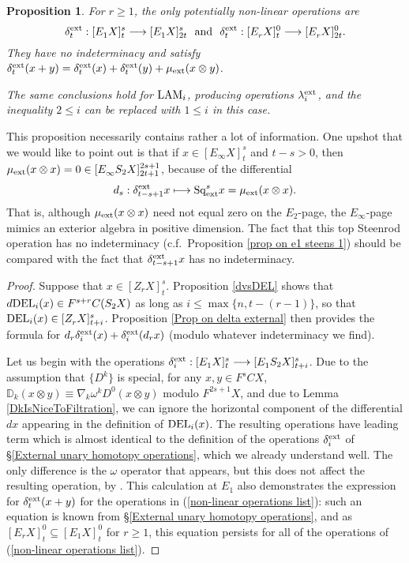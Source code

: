 \documentclass[11pt]{amsart} \renewcommand{\baselinestretch}{1.2}
\theoremstyle{plain}
\newtheorem{prop}[thm]{Proposition}
\numberwithin{equation}{section} %
\theoremstyle{plain}
\newtheorem{prop}[thm]{Proposition}
\numberwithin{equation}{chapter} %
\renewcommand{\to}{\longrightarrow}
\newcommand{\twist}{\omega}
\newcommand{\Sq}{\mathrm{Sq}}
\newcommand{\E}[5]{[E^{#1}_{#2}#3]^{#4}_{#5}}
\newcommand{\Edownup}[5]{[E_{#1}^{#2}#3]^{#4}_{#5}}
\newcommand{\EZdownup}[5]{[Z^{#2}_{#1}#3]^{#4}_{#5}}
\renewcommand{\mapsto}{\longmapsto}
\begin{document}
\begin{second quadrant homotopy sseq operations}
\begin{prop}
For $r\geq1$, the only potentially non-linear operations are
\begin{equation}
\label{non-linear  operations list}
\delta^\textup{ext}_t: \E{}{1}{X}{s}{t}\to  \E{}{1}{X}{s}{2t}\textup{ \ and \ } \delta^\textup{ext}_t: \E{}{r}{X}{0}{t}\to  \E{}{r}{X}{0}{2t}.
\end{equation}
They  have no indeterminacy and satisfy $\delta^\textup{ext}_t(x+y)=\delta^\textup{ext}_t(x)+\delta^\textup{ext}_t(y)+\mu_\textup{ext}(x\otimes y)$.


The same conclusions hold for $\textup{LAM}_i$, producing operations $\lambda_i^\textup{ext}$, and the inequality $2\leq i$ can be replaced with $1\leq i$ in this case.
\end{prop}
\noindent This proposition necessarily contains rather a lot of information. One upshot that we would like to point out is that if $x\in \E{}{\infty}{X}{s}{t}$ and $t-s>0$, then $\mu_\textup{ext}(x\otimes x)=0\in\E{}{\infty}{S_2X}{2s+1}{2t+1}$, because of the differential
\[d_{s}:\delta^\textup{ext}_{t-s+1}x\mapsto \Sq_\textup{ext}^{s}x=\mu_\textup{ext}(x\otimes x).\]
That is, although $\mu_\textup{ext}(x\otimes x)$ need not equal zero on the $E_2$-page, the $E_\infty$-page mimics an exterior algebra in positive dimension.
The fact  that this top Steenrod operation has no indeterminacy (c.f.\ Proposition \ref{prop on e1 steens 1}) should be compared  with the fact that $\delta^\textup{ext}_{t-s+1}x$ has no indeterminacy.

\begin{proof}
Suppose that $x\in \EZdownup{r}{}{X}{s}{t}$. Proposition \ref{dvsDEL} shows that $d\textup{DEL}_i(x)\in F^{s+r}C(S_2X)$ as long as $i\leq \max\{n,t-(r-1)\}$, so that $\textup{DEL}_i(x)\in \EZdownup{r}{}{X}{s}{t+i}$. 
Proposition \ref{Prop on delta external} then provides the formula for 
$d_r\delta^\textup{ext}_i(x)+ \delta^\textup{ext}_i(d_rx)$ (modulo whatever indeterminacy we find).

Let us begin with the operations $\delta^\textup{ext}_i:\Edownup{1}{}{X}{s}{t}\to \Edownup{1}{}{S_2X}{s}{t+i}$. Due to the assumption that $\{D^k\}$ is special, for any $x,y\in F^{s}CX$, $\mathbb{D}_k(x\otimes  y)\equiv \nabla_k\twist^k D^0(x\otimes y) $ modulo $F^{2s+1}X$, and due to Lemma \ref{DkIsNiceToFiltration}, we can ignore the horizontal component of the differential $dx$ appearing in the definition of $\textup{DEL}_i(x)$. The resulting operations have leading term which is almost identical to the definition of the operations $\delta_i^\textup{ext}$ of \S\ref{External unary homotopy operations}, which we already understand well. The only difference is the $\twist$ operator that appears, but this does not affect the resulting operation, by \cite[Lemma 4.1]{DwyerHtpyOpsSimpComAlg.pdf}. This calculation at $E_1$ also demonstrates the expression for $\delta_t^\textup{ext}(x+y)$ for the operations in (\ref{non-linear  operations list}): such an equation is known from \S\ref{External unary homotopy operations}, and as $\Edownup{r}{}{X}{0}{t}\subseteq \Edownup{1}{}{X}{0}{t}$ for $r\geq1$, this equation persists for all of the operations of (\ref{non-linear  operations list}).


\end{proof}
\end{second quadrant homotopy sseq operations}
\end{document}
